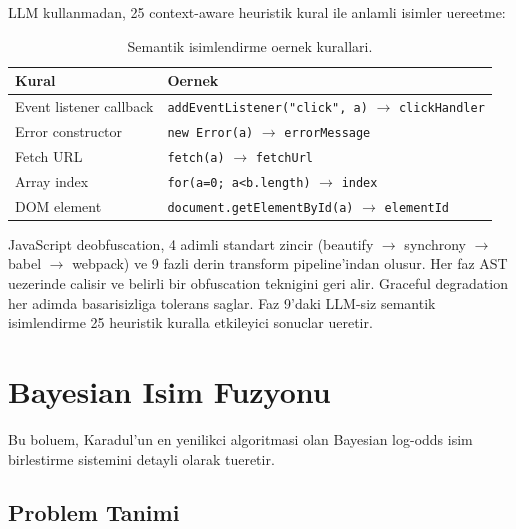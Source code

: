 \documentclass[12pt,a4paper,oneside]{book}
\theoremstyle{definition}
\newcommand{\code}[1]{\texttt{\color{green!60!white}#1}}
\begin{document}
LLM kullanmadan, 25 context-aware heuristik kural ile anlamli isimler uereetme:

\begin{table}[h]
\centering
\small
\begin{tabular}{p{5cm}p{8cm}}
\toprule
\textbf{\color{sectioncyan}Kural} & \textbf{\color{sectioncyan}Oernek} \\
\midrule
Event listener callback & \code{addEventListener("click", a)} $\to$ \code{clickHandler} \\
Error constructor & \code{new Error(a)} $\to$ \code{errorMessage} \\
Fetch URL & \code{fetch(a)} $\to$ \code{fetchUrl} \\
Array index & \code{for(a=0; a<b.length)} $\to$ \code{index} \\
DOM element & \code{document.getElementById(a)} $\to$ \code{elementId} \\
\bottomrule
\end{tabular}
\caption{Semantik isimlendirme oernek kurallari.}
\label{tab:semantic-rules}
\end{table}

\begin{ozet}
JavaScript deobfuscation, 4 adimli standart zincir (beautify $\to$ synchrony $\to$ babel $\to$ webpack) ve 9 fazli derin transform pipeline'indan olusur. Her faz AST uezerinde calisir ve belirli bir obfuscation tekni\-gini geri alir. Graceful degradation her adimda basarisizliga tolerans saglar. Faz 9'daki LLM-siz semantik isimlendirme 25 heuristik kuralla etkileyici sonuclar ueretir.
\end{ozet}






\chapter{Bayesian Isim Fuzyonu}
\label{ch:bayesian}

Bu boluem, Karadul'un en yenilikci algoritmasi olan Bayesian log-odds isim birlestirme sistemini detayli olarak tueret\-ir.

\section{Problem Tanimi}
\label{sec:naming-problem}
\end{document}
